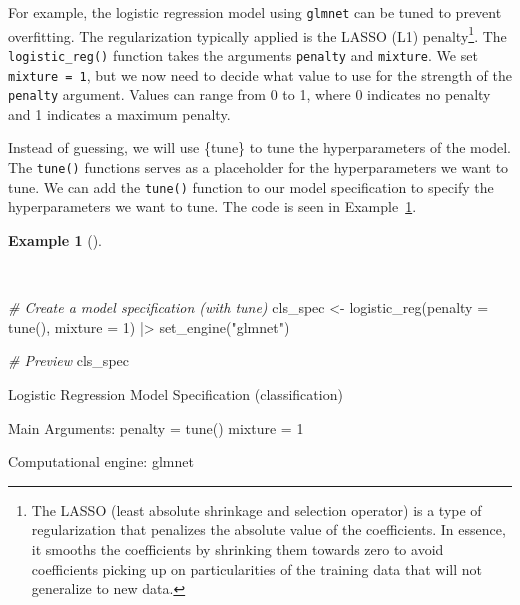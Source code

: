 \documentclass[
  letterpaper,
]{latex/krantz}
\newenvironment{Shaded}{\begin{snugshade}}{\end{snugshade}}
\newcommand{\AttributeTok}[1]{\textcolor[rgb]{0.00,0.00,0.00}{#1}}
\newcommand{\CommentTok}[1]{\textcolor[rgb]{0.00,0.00,0.00}{\textit{#1}}}
\newcommand{\DecValTok}[1]{\textcolor[rgb]{0.00,0.00,0.00}{#1}}
\newcommand{\FunctionTok}[1]{\textcolor[rgb]{0.00,0.00,0.00}{#1}}
\newcommand{\NormalTok}[1]{\textcolor[rgb]{0.00,0.00,0.00}{#1}}
\newcommand{\OtherTok}[1]{\textcolor[rgb]{0.00,0.00,0.00}{#1}}
\newcommand{\SpecialCharTok}[1]{\textcolor[rgb]{0.00,0.00,0.00}{#1}}
\newcommand{\StringTok}[1]{\textcolor[rgb]{0.00,0.00,0.00}{#1}}
\theoremstyle{definition}
\newtheorem{example}{Example}[chapter]
\theoremstyle{remark}
\begin{document}
For example, the logistic regression model using \texttt{glmnet} can be
tuned to prevent overfitting. The regularization typically applied is
the LASSO (L1) penalty\footnote{The LASSO (least absolute shrinkage and
  selection operator) is a type of regularization that penalizes the
  absolute value of the coefficients. In essence, it smooths the
  coefficients by shrinking them towards zero to avoid coefficients
  picking up on particularities of the training data that will not
  generalize to new data.}. The \texttt{logistic\_reg()} function takes
the arguments \texttt{penalty} and \texttt{mixture}. We set
\texttt{mixture\ =\ 1}, but we now need to decide what value to use for
the strength of the \texttt{penalty} argument. Values can range from 0
to 1, where 0 indicates no penalty and 1 indicates a maximum penalty.

Instead of guessing, we will use \{tune\} to tune the hyperparameters of
the model. The \texttt{tune()} functions serves as a placeholder for the
hyperparameters we want to tune. We can add the \texttt{tune()} function
to our model specification to specify the hyperparameters we want to
tune. The code is seen in
Example~\ref{exm-predict-class-model-spec-tune}.

\begin{example}[]\protect\hypertarget{exm-predict-class-model-spec-tune}{}\label{exm-predict-class-model-spec-tune}

~

\begin{Shaded}
\begin{Highlighting}[]
\CommentTok{\# Create a model specification (with tune)}
\NormalTok{cls\_spec }\OtherTok{\textless{}{-}}
  \FunctionTok{logistic\_reg}\NormalTok{(}\AttributeTok{penalty =} \FunctionTok{tune}\NormalTok{(), }\AttributeTok{mixture =} \DecValTok{1}\NormalTok{) }\SpecialCharTok{|\textgreater{}}
  \FunctionTok{set\_engine}\NormalTok{(}\StringTok{"glmnet"}\NormalTok{)}

\CommentTok{\# Preview}
\NormalTok{cls\_spec}
\end{Highlighting}
\end{Shaded}

\begin{Shaded}
\begin{Highlighting}[]
\NormalTok{Logistic Regression Model Specification (classification)}

\NormalTok{Main Arguments:}
\NormalTok{  penalty = tune()}
\NormalTok{  mixture = 1}

\NormalTok{Computational engine: glmnet}
\end{Highlighting}
\end{Shaded}

\end{example}
\end{document}
